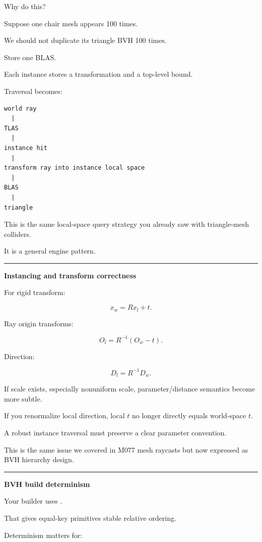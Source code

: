 Why do this?

Suppose one chair mesh appears 100 times.

We should not duplicate its triangle BVH 100 times.

Store one BLAS.

Each instance stores a transformation and a top-level bound.

Traversal becomes:

\begin{verbatim}
world ray
  |
TLAS
  |
instance hit
  |
transform ray into instance local space
  |
BLAS
  |
triangle
\end{verbatim}

This is the same local-space query strategy you already saw with triangle-mesh colliders.

It is a general engine pattern.

\begin{center}\rule{0.5\linewidth}{0.5pt}\end{center}

\textbf{Instancing and transform correctness}

For rigid transform:

\[
x_w=Rx_l+t.
\]

Ray origin transforms:

\[
O_l=R^{-1}(O_w-t).
\]

Direction:

\[
D_l=R^{-1}D_w.
\]

If scale exists, especially nonuniform scale, parameter/distance semantics become more subtle.

If you renormalize local direction, local \(t\) no longer directly equals world-space \(t\).

A robust instance traversal must preserve a clear parameter convention.

This is the same issue we covered in M077 mesh raycasts but now expressed as BVH hierarchy design.

\begin{center}\rule{0.5\linewidth}{0.5pt}\end{center}

\textbf{BVH build determinism}

Your builder uses .

That gives equal-key primitives stable relative ordering.

Determinism matters for:


